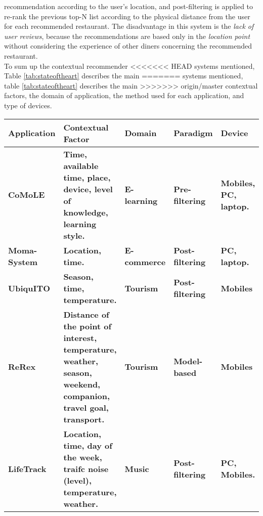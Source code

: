 recommendation according to the user's location, and  post-filtering
is applied to re-rank the previous top-N list according to the
physical distance from the user for each recommended restaurant. The
disadvantage in this system is the \textit{lack of user reviews},
because the recommendations are based only in the \textit{location
point} without considering the experience of other diners concerning the
recommended restaurant.\\ To sum up the contextual recommender 
<<<<<<< HEAD
systems mentioned, Table \ref{tab:stateoftheart} describes the main 
=======
systems mentioned, table \ref{tab:stateoftheart} describes the main 
>>>>>>> origin/master
contextual factors, the domain of application, the method used for each 
application, and type of devices.
\begin{sidewaystable}[]
  \caption{Comparison of context-aware recommender systems.}
  \label{tab:stateoftheart}
  \bigskip
    \centering\small\setlength\tabcolsep{2pt}
        \hspace*{-1cm}\begin{tabular}{p{3.5cm} p{6cm} p{4cm} p{3cm} p{3cm} }
           \toprule
             \textbf{Application} &\textbf{Contextual Factor} &\textbf{Domain} &
             \textbf{Paradigm} &\textbf{Device}  \\ \hline
           \midrule
             \textbf{CoMoLE} & \textbf{Time, available time, place, device, level of
            knowledge, learning style.} & \textbf{E-learning} & \textbf{Pre-filtering} 
             & \textbf{Mobiles, PC, laptop.}   \\ \hline 
             \textbf{Moma-System} & \textbf{Location, time.} & 
             \textbf{E-commerce} & \textbf{Post-filtering} & \textbf{PC, laptop.}  \\ 
             \hline
             \textbf{UbiquITO} & \textbf{Season, time, temperature.} & 
             \textbf{Tourism} & \textbf{Post-filtering} & \textbf{Mobiles} \\ \hline
             \textbf{ReRex} & \textbf{Distance of the point of interest,  temperature,
             weather, season, weekend, companion, travel goal, transport.} & 
             \textbf{Tourism} & \textbf{Model-based} & \textbf{Mobiles} \\ \hline
             \textbf{LifeTrack} & \textbf{Location, time, day of the week, traifc noise
             (level), temperature, weather.} & \textbf{Music} & \textbf{ Post-filtering} 
             & \textbf{PC, Mobiles.} \\ \hline

\end{tabular}
\end{sidewaystable}
